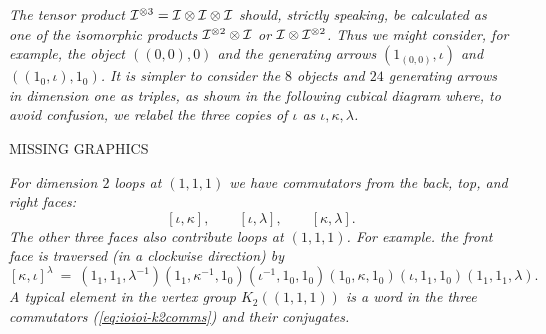 \newpage
\begin{example}
\emph{The tensor product $\mathcal{I}^{\otimes 3} = \mathcal{I}\otimes\mathcal{I}\otimes\mathcal{I}$ 
should, strictly speaking, be calculated as one of the isomorphic products 
$\mathcal{I}^{\otimes 2}\otimes\mathcal{I}$ or $\mathcal{I}\otimes\mathcal{I}^{\otimes 2}$. 
Thus we might consider, for example, the object $((0,0),0)$ 
and the generating arrows $(1_{(0,0)},\iota)$ and $((1_0,\iota),1_0)$. 
It is simpler to consider the $8$ objects and $24$ generating arrows
in dimension one as triples, as shown in the following cubical diagram where, 
to avoid confusion, we relabel the three copies of $\iota$ 
as $\iota,\kappa,\lambda$.} 

\begin{center}
MISSING GRAPHICS
\end{center}

\noindent
\emph{For dimension $2$ loops at $(1,1,1)$ we have commutators 
from the back, top, and right faces:} 
\begin{equation} \label{eq:ioioi-k2comms}
[\iota,\kappa], \qquad
[\iota,\lambda], \qquad 
[\kappa,\lambda].
\end{equation}
\emph{The other three faces also contribute loops at $(1,1,1)$. 
For example. the front face is traversed (in a clockwise direction) by} 
$$
[\kappa,\iota]^{\lambda} ~=~ 
(1_1,1_1,\lambda^{-1})(1_1,\kappa^{-1},1_0)(\iota^{-1},1_0,1_0)
(1_0,\kappa,1_0)(\iota,1_1,1_0)(1_1,1_1,\lambda).
$$
\emph{A typical element in the vertex group $K_2((1,1,1))$ is a word 
in the three commutators (\ref{eq:ioioi-k2comms}) and their conjugates.} 


\end{example}
